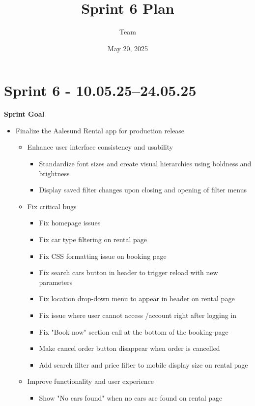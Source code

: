 \documentclass[a4paper,12pt]{article}
\title{Sprint 6 Plan}
\author{Team}
\date{May 20, 2025}
\begin{document}
\maketitle

\section*{Sprint 6 - 10.05.25--24.05.25}
\textbf{Sprint Goal}

\begin{itemize}
    \item Finalize the Aalesund Rental app for production release
    \begin{itemize}
        \item Enhance user interface consistency and usability
        \begin{itemize}
            \item Standardize font sizes and create visual hierarchies using boldness and brightness
            \item Display saved filter changes upon closing and opening of filter menus
        \end{itemize}
        \item Fix critical bugs
        \begin{itemize}
            \item Fix homepage issues
            \item Fix car type filtering on rental page
            \item Fix CSS formatting issue on booking page 
            \item Fix search cars button in header to trigger reload with new parameters
            \item Fix location drop-down menu to appear in header on rental page
            \item Fix issue where user cannot access /account right after logging in
            \item Fix "Book now" section call at the bottom of the booking-page
            \item Make cancel order button disappear when order is cancelled
            \item Add search filter and price filter to mobile display size on rental page
        \end{itemize}
        \item Improve functionality and user experience
        \begin{itemize}
            \item Show "No cars found" when no cars are found on rental page

\end{itemize}
\end{itemize}
\end{itemize}
\end{document}
